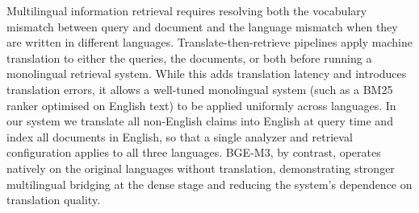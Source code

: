 Multilingual information retrieval requires resolving both the vocabulary mismatch between query and document and the language mismatch when they are written in different languages. Translate-then-retrieve pipelines apply machine translation to either the queries, the documents, or both before running a monolingual retrieval system. While this adds translation latency and introduces translation errors, it allows a well-tuned monolingual system (such as a BM25 ranker optimised on English text) to be applied uniformly across languages. In our system we translate all non-English claims into English at query time and index all documents in English, so that a single analyzer and retrieval configuration applies to all three languages. BGE-M3, by contrast, operates natively on the original languages without translation, demonstrating stronger multilingual bridging at the dense stage and reducing the system's dependence on translation quality.
